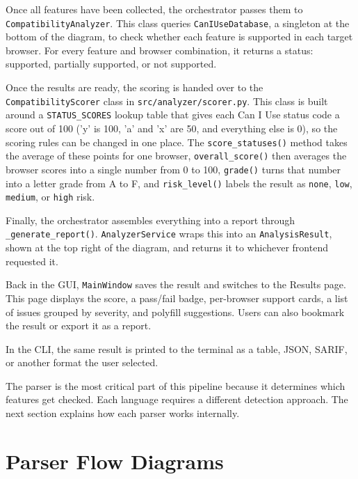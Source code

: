 Once all features have been collected, the orchestrator passes them to \texttt{CompatibilityAnalyzer}. This class queries \texttt{CanIUseDatabase}, a singleton at the bottom of the diagram, to check whether each feature is supported in each target browser. For every feature and browser combination, it returns a status: supported, partially supported, or not supported.

Once the results are ready, the scoring is handed over to the \texttt{CompatibilityScorer} class in \texttt{src/analyzer/scorer.py}. This class is built around a \texttt{STATUS\_SCORES} lookup table that gives each Can I Use status code a score out of 100 ('y' is 100, 'a' and 'x' are 50, and everything else is 0), so the scoring rules can be changed in one place. The \texttt{score\_statuses()} method takes the average of these points for one browser, \texttt{overall\_score()} then averages the browser scores into a single number from 0 to 100, \texttt{grade()} turns that number into a letter grade from A to F, and \texttt{risk\_level()} labels the result as \texttt{none}, \texttt{low}, \texttt{medium}, or \texttt{high} risk.

Finally, the orchestrator assembles everything into a report through \texttt{\_generate\_report()}. \texttt{AnalyzerService} wraps this into an \texttt{AnalysisResult}, shown at the top right of the diagram, and returns it to whichever frontend requested it.

Back in the GUI, \texttt{MainWindow} saves the result and switches to the Results page. This page displays the score, a pass/fail badge, per-browser support cards, a list of issues grouped by severity, and polyfill suggestions. Users can also bookmark the result or export it as a report.

In the CLI, the same result is printed to the terminal as a table, JSON, SARIF, or another format the user selected.

The parser is the most critical part of this pipeline because it determines which features get checked. Each language requires a different detection approach. The next section explains how each parser works internally.

\section{Parser Flow Diagrams}
\label{sec:parser-flows}


